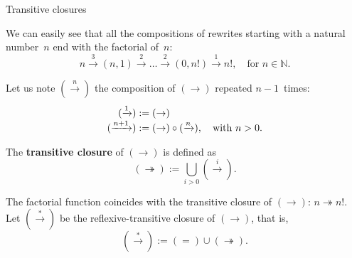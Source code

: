 \documentclass[compress,dvipdfmx]{beamer}
\begin{document}
%
\begin{frame}{Transitive closures}

  We can easily see that all the compositions of rewrites starting
  with a natural number~\(n\) end with the factorial of~\(n\):
  \smallskip
  \begin{equation*}
    n \xrightarrow{3} (n,1)
    \xrightarrow{2} \dots
    \xrightarrow{2} (0,n!)
    \xrightarrow{1}
    n!, \quad \text{for \(n \in \mathbb{N}\)}.
  \end{equation*}

  Let us note \((\xrightarrow{n})\) the composition of
  \((\rightarrow)\) repeated \(n-1\)~times:
  \begin{align*}
    (\xrightarrow{1})   &:= (\rightarrow)\\
    (\xrightarrow{\smash{n+1}}) & :=
    (\rightarrow) \circ (\xrightarrow{\smash{n}}),
    \quad\text{with \(n > 0\)}.
  \end{align*}

  The \textbf{transitive closure} of \((\rightarrow)\) is defined as
  \begin{equation*}
    (\twoheadrightarrow) := \bigcup_{i > 0}{(\xrightarrow{i})}.
  \end{equation*}

  The factorial function coincides with the transitive closure of
  \((\rightarrow)\): \(n \twoheadrightarrow n!\). Let
  \((\xrightarrow{*})\) be the reflexive\hyp{}transitive closure of
  \((\rightarrow)\), that is,
  \begin{equation*}
    (\xrightarrow{*}) := (=) \cup (\twoheadrightarrow).
  \end{equation*}

\end{frame}
\end{document}
